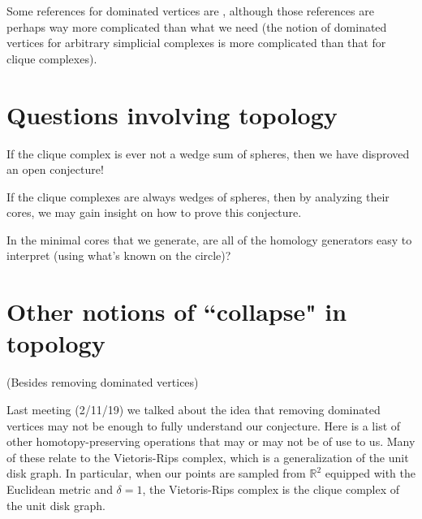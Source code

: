 \documentclass[amscd, amssymb, verbatim]{amsart}[12pt]
\theoremstyle{plain}
\theoremstyle{definition}
\newcommand{\R}{\mathbb{R}}
\begin{document}
Some references for dominated vertices are \cite{BabsonKozlov2006,barmak2012strong,Matouvsek2008}, although those references are perhaps way more complicated than what we need (the notion of dominated vertices for arbitrary simplicial complexes is more complicated than that for clique complexes).


\section{Questions involving topology}

If the clique complex is ever not a wedge sum of spheres, then we have disproved an open conjecture!

If the clique complexes are always wedges of spheres, then by analyzing their cores, we may gain insight on how to prove this conjecture.

In the minimal cores that we generate, are all of the homology generators easy to interpret (using what's known on the circle)?



\section{Other notions of ``collapse" in topology}\label{sec:collapse}

(Besides removing dominated vertices)

Last meeting (2/11/19) we talked about the idea that removing dominated vertices may not be enough to fully understand our conjecture. Here is a list of other homotopy-preserving operations that may or may not be of use to us. Many of these relate to the Vietoris-Rips complex, which is a generalization of the unit disk graph. In particular, when our points are sampled from $\R^2$ equipped with the Euclidean metric and $\delta=1$, the Vietoris-Rips complex is the clique complex of the unit disk graph.
\end{document}
